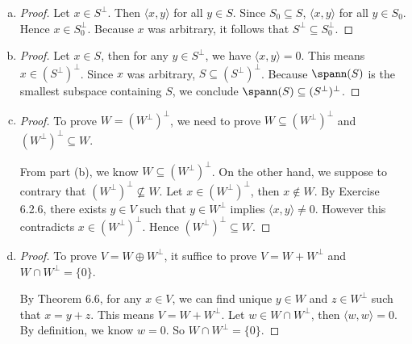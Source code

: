 \begin{Exercise}
\begin{enumerate}[(a)]
\item
\begin{proof}
Let $x\in S^{\perp}$. Then $\langle x,y \rangle$ for all $y\in S$. Since $S_0 \subseteq S$, $\langle x,y \rangle$ for all $y\in S_0$. Hence $x\in S_0^{\perp}$. Because $x$ was arbitrary, it follows that $S^{\perp}\subseteq S_0^{\perp}$.
\end{proof}

\item
\begin{proof}
Let $x\in S$, then for any $y\in S^{\perp}$, we have $\langle x,y \rangle = 0$. This means $x\in (S^{\perp})^{\perp}$. Since $x$ was arbitrary, $S\subseteq (S^{\perp})^{\perp}$. Because $\spann(S)$ is the smallest subspace containing $S$, we conclude $\spann(S)\subseteq (S^{\perp})^{\perp}$.
\end{proof}

\item
\begin{proof}
To prove $W = (W^{\perp})^{\perp}$, we need to prove $W \subseteq (W^{\perp})^{\perp}$ and $(W^{\perp})^{\perp} \subseteq W$.

From part (b), we know $W \subseteq (W^{\perp})^{\perp}$. On the other hand, we suppose to contrary that  $(W^{\perp})^{\perp} \nsubseteq W$. Let $x\in (W^{\perp})^{\perp}$, then $x\notin W$. By Exercise 6.2.6, there exists $y\in V$ such that $y\in W^{\perp}$ implies $\langle x,y \rangle \neq 0$. However this contradicts $x\in (W^{\perp})^{\perp}$. Hence $(W^{\perp})^{\perp} \subseteq W$.
\end{proof}

\item
\begin{proof}
To prove $V = W \oplus W^{\perp}$, it suffice to prove $V = W + W^{\perp}$ and $W\cap W^{\perp} = \{0\}$.

By Theorem 6.6, for any $x\in V$, we can find unique $y\in W$ and $z\in W^{\perp}$ such that $x = y+z$. This means $V = W + W^{\perp}$. Let $w\in W\cap W^{\perp}$, then $\langle w, w \rangle=0$. By definition, we know $w = 0$. So $W\cap W^{\perp} = \{0\}$.
\end{proof}

\end{enumerate}
\end{Exercise}